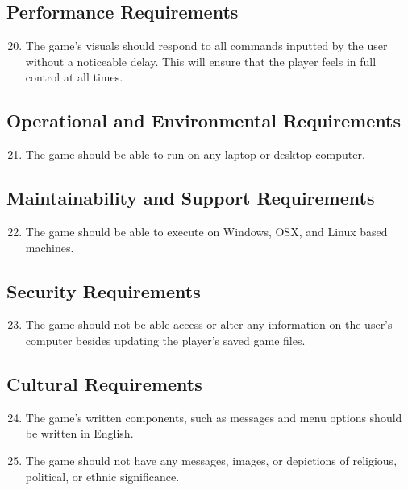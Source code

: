\documentclass[12pt, titlepage]{article}
\begin{document}
\subsection{Performance Requirements}
\begin{enumerate}
\setcounter{enumi}{19}
	\item The game's visuals should respond to all commands inputted by the user without a noticeable delay. This will ensure that the player feels in full control at all times.
\end{enumerate}

\subsection{Operational and Environmental Requirements}
\begin{enumerate}
\setcounter{enumi}{20}
	\item The game should be able to run on any laptop or desktop computer.
\end{enumerate}

\subsection{Maintainability and Support Requirements}
\begin{enumerate}
\setcounter{enumi}{21}
	\item The game should be able to execute on Windows, OSX, and Linux based machines.
\end{enumerate}

\subsection{Security Requirements}
\begin{enumerate}
\setcounter{enumi}{22}
	\item The game should not be able access or alter any information on the user's computer besides updating the player's saved game files.
\end{enumerate}

\subsection{Cultural Requirements}
\begin{enumerate}
\setcounter{enumi}{23}
	\item The game's written components, such as messages and menu options should be written in English.
	\item The game should not have any messages, images, or depictions of religious, political, or ethnic significance.
\end{enumerate}
\end{document}
